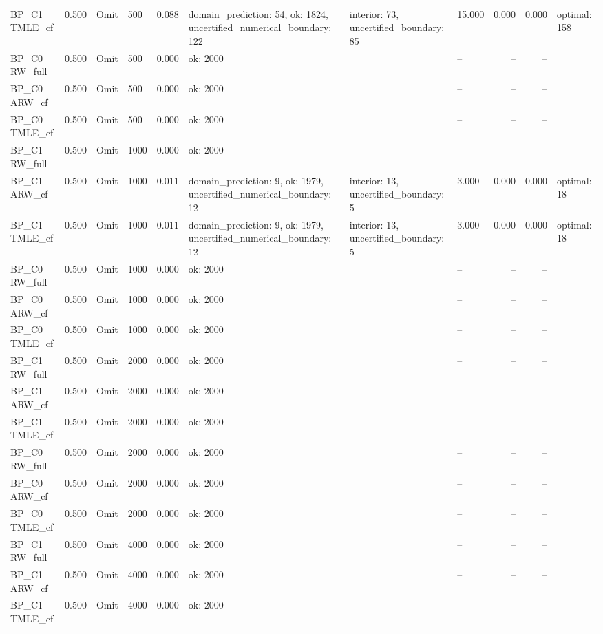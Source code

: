\begin{tabular}{llllrlllrrl}
BP\_C1 TMLE\_cf & 0.500 & Omit & 500 & 0.088 & domain\_prediction: 54, ok: 1824, uncertified\_numerical\_boundary: 122 & interior: 73, uncertified\_boundary: 85 & 15.000 & 0.000 & 0.000 & optimal: 158 \\
BP\_C0 RW\_full & 0.500 & Omit & 500 & 0.000 & ok: 2000 &  & -- & -- & -- &  \\
BP\_C0 ARW\_cf & 0.500 & Omit & 500 & 0.000 & ok: 2000 &  & -- & -- & -- &  \\
BP\_C0 TMLE\_cf & 0.500 & Omit & 500 & 0.000 & ok: 2000 &  & -- & -- & -- &  \\
BP\_C1 RW\_full & 0.500 & Omit & 1000 & 0.000 & ok: 2000 &  & -- & -- & -- &  \\
BP\_C1 ARW\_cf & 0.500 & Omit & 1000 & 0.011 & domain\_prediction: 9, ok: 1979, uncertified\_numerical\_boundary: 12 & interior: 13, uncertified\_boundary: 5 & 3.000 & 0.000 & 0.000 & optimal: 18 \\
BP\_C1 TMLE\_cf & 0.500 & Omit & 1000 & 0.011 & domain\_prediction: 9, ok: 1979, uncertified\_numerical\_boundary: 12 & interior: 13, uncertified\_boundary: 5 & 3.000 & 0.000 & 0.000 & optimal: 18 \\
BP\_C0 RW\_full & 0.500 & Omit & 1000 & 0.000 & ok: 2000 &  & -- & -- & -- &  \\
BP\_C0 ARW\_cf & 0.500 & Omit & 1000 & 0.000 & ok: 2000 &  & -- & -- & -- &  \\
BP\_C0 TMLE\_cf & 0.500 & Omit & 1000 & 0.000 & ok: 2000 &  & -- & -- & -- &  \\
BP\_C1 RW\_full & 0.500 & Omit & 2000 & 0.000 & ok: 2000 &  & -- & -- & -- &  \\
BP\_C1 ARW\_cf & 0.500 & Omit & 2000 & 0.000 & ok: 2000 &  & -- & -- & -- &  \\
BP\_C1 TMLE\_cf & 0.500 & Omit & 2000 & 0.000 & ok: 2000 &  & -- & -- & -- &  \\
BP\_C0 RW\_full & 0.500 & Omit & 2000 & 0.000 & ok: 2000 &  & -- & -- & -- &  \\
BP\_C0 ARW\_cf & 0.500 & Omit & 2000 & 0.000 & ok: 2000 &  & -- & -- & -- &  \\
BP\_C0 TMLE\_cf & 0.500 & Omit & 2000 & 0.000 & ok: 2000 &  & -- & -- & -- &  \\
BP\_C1 RW\_full & 0.500 & Omit & 4000 & 0.000 & ok: 2000 &  & -- & -- & -- &  \\
BP\_C1 ARW\_cf & 0.500 & Omit & 4000 & 0.000 & ok: 2000 &  & -- & -- & -- &  \\
BP\_C1 TMLE\_cf & 0.500 & Omit & 4000 & 0.000 & ok: 2000 &  & -- & -- & -- &  \\

\end{tabular}
